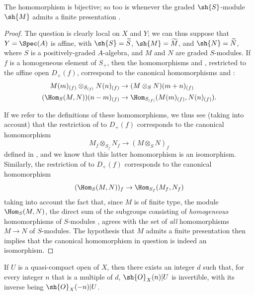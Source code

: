 
\begin{proposition}[8.14.3]
\label{II.8.14.3}
The homomorphism  is bijective;
so too is  whenever the graded $\sh{S}$-module $\sh{M}$ admits a finite presentation .
\end{proposition}

\begin{proof}
The question is clearly local on $X$ and $Y$;
we can thus suppose that $Y=\Spec(A)$ is affine, with $\sh{S}=\widetilde{S}$, $\sh{M}=\widetilde{M}$, and $\sh{N}=\widetilde{N}$, where $S$ is a positively-graded $A$-algebra, and $M$ and $N$ are graded $S$-modules.
If $f$ is a homogeneous element of $S_+$, then the homomorphisms  and , restricted to the affine open $D_+(f)$, correspond to the canonical homomorphisms  and :
\begin{align*}
    M(m)_{(f)}\otimes_{S_{(f)}}N(n)_{(f)}
    &\to
    (M\otimes_S N)(m+n)_{(f)}
\\  (\Hom_S(M,N))(n-m)_{(f)}
    &\to
    \Hom_{S_{(f)}}(M(m)_{(f)},N(n)_{(f)}).
\end{align*}

If we refer to the definitions of these homomorphisms, we thus see (taking  into account) that the restriction of  to $D_+(f)$ corresponds to the canonical homomorphism
\[
    M_f\otimes_{S_f}N_f \to (M\otimes_S N)_f
\]
defined in , and we know that this latter homomorphism is an isomorphism.
Similarly, the restriction of  to $D_+(f)$ corresponds to the canonical homomorphism 
\[
    (\Hom_S(M,N))_f \to \Hom_{S_f}(M_f,N_f)
\]
taking into account the fact that, since $M$ is of finite type, the module $\Hom_S(M,N)$, the direct sum of the subgroups consisting of \emph{homogeneous} homomorphisms of $S$-modules , agrees with the set of \emph{all} homomorphisms $M\to N$ of $S$-modules.
The hypothesis that $M$ admits a finite presentation then implies  that the canonical homomorphism in question is indeed an isomorphism.
\end{proof}

\begin{proposition}[8.14.4]
\label{II.8.14.4}
If $U$ is a quasi-compact open of $X$, then there exists an integer $d$ such that, for every integer $n$ that is a multiple of $d$, $\sh{O}_X(n)|U$ is invertible, with its inverse being $\sh{O}_X(-n)|U$.
\end{proposition}

